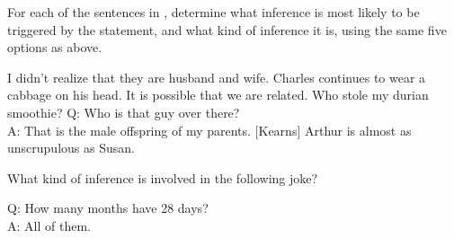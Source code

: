 {For each of the sentences in , determine what inference is most likely to be triggered by the statement, and what kind of inference it is, using the same five options as above.

\ea
    \label{ex:8:exercise:5}
\ea%
 I didn’t realize that they are husband and wife.
\ex Charles continues to wear a cabbage on his head.
\ex It is possible that we are related.
\ex  Who stole my durian smoothie?
\ex  Q: Who is that guy over there?\\
A: That is the male offspring of my parents.  [Kearns]
\ex  Arthur is almost as unscrupulous as Susan.
\z
\z

What kind of inference is involved in the following joke?


\ea%
Q: How many months have 28 days? \\
A: All of them.    
\z

}
